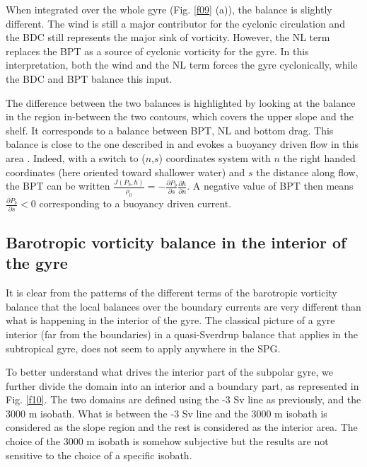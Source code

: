 \documentclass[os, manuscript]{copernicus}
\begin{document}
When integrated over the whole gyre (Fig. \ref{f09} (a)), the balance is slightly different. The wind is still a major contributor for the cyclonic circulation and the BDC still represents the major sink of vorticity. However, the NL term replaces the BPT as a source of cyclonic vorticity for the gyre. In this interpretation, both the wind and the NL term forces the gyre cyclonically, while the BDC and BPT balance this input. 


The difference between the two balances is highlighted by looking at the balance in the region in-between the two contours, which covers the upper slope and the shelf. It corresponds to a balance between BPT, NL and bottom drag. This balance is close to the one described in \citet{csanady1978} and evokes a buoyancy driven flow in this area \citep{chapman1989}. Indeed, with a switch to ($n$,$s$) coordinates system with $n$ the right handed coordinates (here oriented toward shallower water) and $s$ the distance along flow, the BPT can be written $\frac{J(P_b,h)}{\rho _0}=-\frac{\partial P_b}{\partial s }\frac{\partial h}{\partial n}$. A negative value of BPT then means $\frac{\partial P_b}{\partial s }<0$ corresponding to a buoyancy driven current.

\subsection{Barotropic vorticity balance in the interior of the gyre}

It is clear from the patterns of the different terms of the barotropic vorticity balance that the local balances over the boundary currents are very different than what is happening in the interior of the gyre. The classical picture of a gyre interior (far from the boundaries) in a quasi-Sverdrup balance that applies in the subtropical gyre,  does not seem to apply anywhere in the SPG. 

To better understand what drives the interior part of the subpolar gyre, we further divide the domain into an interior and a boundary part, as represented in Fig. \ref{f10}. The two domains are defined using the -3 Sv line as previously, and the 3000 m isobath. What is between the -3 Sv line and the 3000 m isobath is considered as the slope region and the rest is considered as the interior area. The choice of the 3000 m isobath is somehow subjective but the results are not sensitive to the choice of a specific isobath. 
\end{document}
